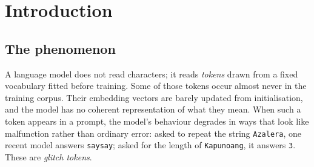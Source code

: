 \documentclass[11pt,a4paper]{article}
\newcommand{\gp}{\textsc{GlitchProber}}
\newcommand{\gc}{\textsc{GlitchCleaner}}
\begin{document}
\begin{abstract}
Where the methods' own claims are testable, we report what we found rather than
what a reproduction study is expected to find. Loading \gc{}'s released weights
reproduces its headline repair rate to within a single token ($2{,}408$ against a
published $2{,}407$ of $2{,}539$), and an earlier version of this study reported a
shortfall on that claim which we now attribute to our own training rather than to
the method. For \gp{}, whose code was never released, two implementation choices
the paper does not state move its repair rate by $7.8\times$ --- a range that
brackets its own published figure, leaving the claim under-determined rather than
refuted.

We subjected our own implementation to an adversarial external audit before
reporting anything. It found two errors that invalidated specific conclusions and
several conclusions stated more strongly than their evidence supported. Both
errors were corrected, the affected experiments re-run, and both the
pre-correction and post-correction numbers are reported --- because the gap
between them measures how sensitive these methods are to implementation choices
that neither paper specifies.
\end{abstract}

{\small\tableofcontents}

\section{Introduction}

\subsection{The phenomenon}

A language model does not read characters; it reads \emph{tokens} drawn from a
fixed vocabulary fitted before training. Some of those tokens occur almost never
in the training corpus. Their embedding vectors are barely updated from
initialisation, and the model has no coherent representation of what they mean.
When such a token appears in a prompt, the model's behaviour degrades in ways that
look like malfunction rather than ordinary error: asked to repeat the string
\texttt{Azalera}, one recent model answers \texttt{saysay}; asked for the length
of \texttt{Kapunoang}, it answers \texttt{3}. These are \emph{glitch tokens}.
\end{document}
